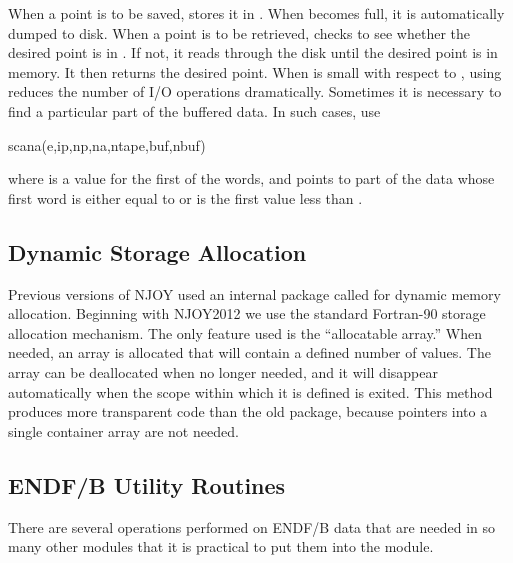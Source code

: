 When a point is to be saved,  stores it in
.  When  becomes full, it is automatically
dumped to disk.  When a point is to be retrieved, 
checks to see whether the desired point is in .  If
not, it reads through the disk until the desired point is in
memory.  It then returns the desired point.  When  is
small with respect to , using 
reduces the number of I/O operations dramatically.
Sometimes it is necessary to find a particular part of the
buffered data.  In such cases, use

\small
\begin{ccode}

      scana(e,ip,np,na,ntape,buf,nbuf)

\end{ccode}
\normalsize

\noindent
where  is a value for the first of the  words,
and  points to part of the data whose first word is
either equal to  or is the first value less than .

\subsection{Dynamic Storage Allocation}
\label{ssNJOY_dynamicstorage}

Previous versions of NJOY used an internal package called
 for dynamic memory allocation.  Beginning with
NJOY2012 we use the
standard Fortran-90 storage allocation mechanism.  The only
feature used is the ``allocatable array.''  When needed, an
array is allocated that will contain a defined number of values.
The array can be deallocated when no longer needed, and it will
disappear automatically when the scope within which it is defined
is exited.  This method produces more transparent code than the
old  package, because pointers into a single
container array are not needed.


\subsection{ENDF/B Utility Routines}
\label{ssNJOY_utility}

There are several operations performed on ENDF/B data that are
needed in so many other modules that it is practical to put them
into the  module.

